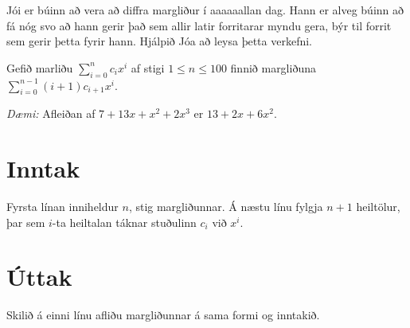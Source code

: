
Jói er búinn að vera að diffra margliður í aaaaaallan dag. Hann er alveg búinn
að fá nóg svo að hann gerir það sem allir latir forritarar myndu gera, býr til
forrit sem gerir þetta fyrir hann. Hjálpið Jóa að leysa þetta verkefni.

Gefið marliðu $\sum_{i = 0}^n c_i x^i$ af stigi $1 \leq n \leq 100$ finnið margliðuna $\sum_{i = 0}^{n-1} (i+1)c_{i+1}x^i$.

\emph{Dæmi:} Afleiðan af $7 + 13x + x^2 + 2x^3$ er $13 + 2x + 6x^2$.

\section*{Inntak}
Fyrsta línan inniheldur $n$, stig margliðunnar. Á næstu línu fylgja $n+1$
heiltölur, þar sem $i$-ta heiltalan táknar stuðulinn $c_i$ við $x^i$.

\section*{Úttak}
Skilið á einni línu afliðu margliðunnar á sama formi og inntakið.

